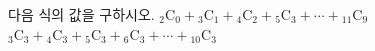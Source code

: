 다음 식의 값을 구하시오.
 ${}_2\mathrm{C}_0+{}_3\mathrm{C}_1+{}_4\mathrm{C}_2+{}_5\mathrm{C}_3+\cdots+{}_{11}\mathrm{C}_9$
 ${}_3\mathrm{C}_3+{}_4\mathrm{C}_3+{}_5\mathrm{C}_3+{}_6\mathrm{C}_3+\cdots+{}_{10}\mathrm{C}_3$
